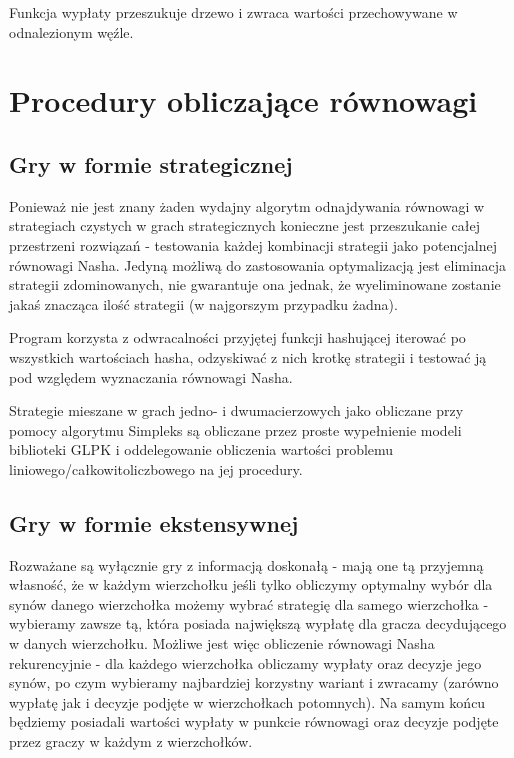 \documentclass{standalone}
\begin{document}
Funkcja wypłaty przeszukuje drzewo i zwraca wartości przechowywane w odnalezionym węźle.

\section{Procedury obliczające równowagi}

\subsection{Gry w formie strategicznej}

Ponieważ nie jest znany żaden wydajny algorytm odnajdywania równowagi w strategiach czystych w grach strategicznych konieczne
jest przeszukanie całej przestrzeni rozwiązań - testowania każdej kombinacji strategii jako potencjalnej równowagi Nasha.
Jedyną możliwą do zastosowania optymalizacją jest eliminacja strategii zdominowanych, nie gwarantuje ona jednak, że wyeliminowane
zostanie jakaś znacząca ilość strategii (w najgorszym przypadku żadna).

Program korzysta z odwracalności przyjętej funkcji hashującej iterować po wszystkich wartościach hasha, odzyskiwać z nich krotkę
strategii i testować ją pod względem wyznaczania równowagi Nasha.

Strategie mieszane w grach jedno- i dwumacierzowych jako obliczane przy pomocy algorytmu Simpleks są obliczane przez proste wypełnienie
modeli biblioteki GLPK i oddelegowanie obliczenia wartości problemu liniowego/całkowitoliczbowego na jej procedury.

\subsection{Gry w formie ekstensywnej}

Rozważane są wyłącznie gry z informacją doskonałą - mają one tą przyjemną własność, że w każdym wierzchołku jeśli
tylko obliczymy optymalny wybór dla synów danego wierzchołka możemy wybrać strategię dla samego wierzchołka - wybieramy
zawsze tą, która posiada największą wypłatę dla gracza decydującego w danych wierzchołku. Możliwe jest więc obliczenie
równowagi Nasha rekurencyjnie - dla każdego wierzchołka obliczamy wypłaty oraz decyzje jego synów, po czym wybieramy najbardziej
korzystny wariant i zwracamy (zarówno wypłatę jak i decyzje podjęte w wierzchołkach potomnych). Na samym końcu będziemy posiadali
wartości wypłaty w punkcie równowagi oraz decyzje podjęte przez graczy w każdym z wierzchołków.
\end{document}
